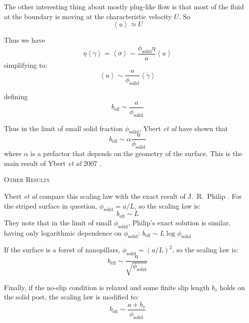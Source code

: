 \documentclass[a4paper]{report}
\newcommand{\beff}{\ensuremath{b_{\mathrm{eff}}}}
\newcommand{\phisol}{\ensuremath{\phi_{\mathrm{solid}}}}
\begin{document}
The other interesting thing about mostly plug-like flow is that most of the fluid at the boundary is moving at the characteristic velocity $U$. So
\begin{equation*}
\left< u \right> \simeq U
\end{equation*}

Thus we have
\begin{equation*}
\eta \left< \dot{\gamma} \right> = \left< \sigma \right> \sim
  \frac{ \phisol \eta} {a} \left< u \right>
\end{equation*}
simplifying to:
\begin{equation*}
\left< u \right> \sim \frac{a}{\phisol}  \left< \dot{\gamma} \right>
\end{equation*}


defining
\begin{equation*}
\beff \sim  \frac{a}{\phisol} 
\end{equation*}

Thus in the limit of small solid fraction $\phisol$, Ybert \emph{et al} have shown that
\begin{equation*}
\beff \sim \alpha  \frac{a}{\phisol} 
\end{equation*}
where $\alpha$ is a prefactor that depends on the geometry of the surface.  This is the main result of Ybert \emph{et al} 2007 \cite{Ybert2007}.


\vspace{1em}
\colorbox[gray]{0.8}{ \textsc{Other Results} }
\vspace{0.5em}


Ybert \emph{et al} compare this scaling law with the exact result of J.\ R.\ Philip \cite{Philip1972}.  For the striped surface in question, $\phisol = a/L$, so the scaling law is:
\begin{equation*}
\beff \sim L
\end{equation*}
They note that in the limit of small $\phisol$, Philip's exact solution is similar, having only logarithmic dependence on $\phisol$: $\beff \sim L \log \phisol $


\vspace{1em}

If the surface is a forest of nanopillars, $\phisol = (a/L)^2$, so the scaling law is:
\begin{equation*}
\beff \sim  \frac{a}{\sqrt{ \phisol}} 
\end{equation*}

\vspace{1em}
Finally, if the no-slip condition is relaxed and some finite slip length $b_s$ holds on the solid post, the scaling law is modified to:
\begin{equation*}
\beff \sim  \frac{a + b_s}{\phisol} 
\end{equation*}
\end{document}
